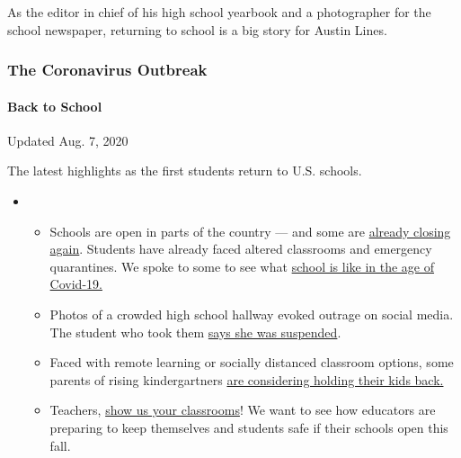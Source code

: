 As the editor in chief of his high school yearbook and a photographer
for the school newspaper, returning to school is a big story for Austin
Lines.

\hypertarget{the-coronavirus-outbreak}{%
\subsubsection{The Coronavirus
Outbreak}\label{the-coronavirus-outbreak}}

\hypertarget{back-to-school}{%
\paragraph{Back to School}\label{back-to-school}}

Updated Aug. 7, 2020

The latest highlights as the first students return to U.S. schools.

\begin{itemize}
\item
  \begin{itemize}
  \tightlist
  \item
    Schools are open in parts of the country --- and some are
    \href{https://www.nytimes3xbfgragh.onion/2020/08/03/us/school-closing-coronavirus.html?action=click\&pgtype=Article\&state=default\&region=MAIN_CONTENT_2\&context=storylines_keepup}{already
    closing again}. Students have already faced altered classrooms and
    emergency quarantines. We spoke to some to see what
    \href{https://www.nytimes3xbfgragh.onion/2020/08/06/us/coronavirus-students.html?action=click\&pgtype=Article\&state=default\&region=MAIN_CONTENT_2\&context=storylines_keepup}{school
    is like in the age of Covid-19.}
  \item
    Photos of a crowded high school hallway evoked outrage on social
    media. The student who took them
    \href{https://www.nytimes3xbfgragh.onion/2020/08/06/us/north-paulding-high-school-coronavirus-georgia.html?action=click\&pgtype=Article\&state=default\&region=MAIN_CONTENT_2\&context=storylines_keepup}{says
    she was suspended}.
  \item
    Faced with remote learning or socially distanced classroom options,
    some parents of rising kindergartners
    \href{https://www.nytimes3xbfgragh.onion/2020/07/23/parenting/school-opening-kindergarten-coronavirus.html?action=click\&pgtype=Article\&state=default\&region=MAIN_CONTENT_2\&context=storylines_keepup}{are
    considering holding their kids back.}
  \item
    Teachers,
    \href{https://www.nytimes3xbfgragh.onion/2020/08/05/reader-center/teachers-show-us-how-the-coronavirus-is-changing-your-classroom.html?action=click\&pgtype=Article\&state=default\&region=MAIN_CONTENT_2\&context=storylines_keepup}{show
    us your classrooms}! We want to see how educators are preparing to
    keep themselves and students safe if their schools open this fall.
  \end{itemize}
\end{itemize}


